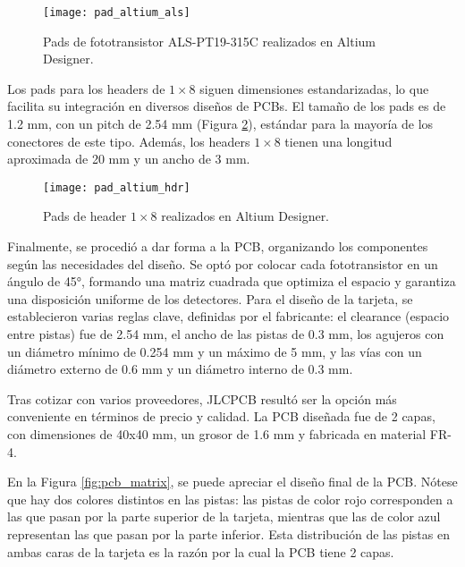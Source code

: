             \begin{figure}[hbtp]
                \centering
                \texttt{[image: pad\_altium\_als]}
                \caption{Pads de fototransistor ALS-PT19-315C realizados en Altium Designer.}
                \label{fig:pad_altium_als}
            \end{figure}

Los pads para los headers de $1\times 8$ siguen dimensiones estandarizadas, lo que facilita su integración en diversos diseños de PCBs. El tamaño de los pads es de 1.2 mm, con un pitch de 2.54 mm (Figura \ref {fig:pad_altium_hdr}), estándar para la mayoría de los conectores de este tipo. Además, los headers $1\times 8$ tienen una longitud aproximada de 20 mm y un ancho de 3 mm.

            \begin{figure}[hbtp]
                \centering
                \texttt{[image: pad\_altium\_hdr]}
                \caption{Pads de header $1 \times 8$ realizados en Altium Designer.}
                \label{fig:pad_altium_hdr}
            \end{figure}

Finalmente, se procedió a dar forma a la PCB, organizando los componentes según las necesidades del diseño. Se optó por colocar cada fototransistor en un ángulo de 45°, formando una matriz cuadrada que optimiza el espacio y garantiza una disposición uniforme de los detectores. Para el diseño de la tarjeta, se establecieron varias reglas clave, definidas por el fabricante: el clearance (espacio entre pistas) fue de 2.54 mm, el ancho de las pistas de 0.3 mm, los agujeros con un diámetro mínimo de 0.254 mm y un máximo de 5 mm, y las vías con un diámetro externo de 0.6 mm y un diámetro interno de 0.3 mm. 


Tras cotizar con varios proveedores, JLCPCB resultó ser la opción más conveniente en términos de precio y calidad. La PCB diseñada fue de 2 capas, con dimensiones de 40x40 mm, un grosor de 1.6 mm y fabricada en material FR-4.


En la Figura \ref{fig:pcb_matrix}, se puede apreciar el diseño final de la PCB. Nótese que hay dos colores distintos en las pistas: las pistas de color rojo corresponden a las que pasan por la parte superior de la tarjeta, mientras que las de color azul representan las que pasan por la parte inferior. Esta distribución de las pistas en ambas caras de la tarjeta es la razón por la cual la PCB tiene 2 capas.


